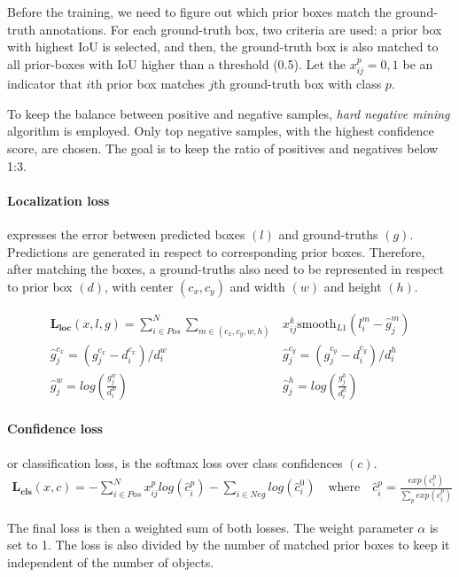 Before the training, we need to figure out which prior boxes match the ground-truth annotations. For each ground-truth box, two criteria are used: a prior box with highest IoU is selected, and then, the ground-truth box is also matched to all prior-boxes with IoU higher than a threshold (0.5). Let the $x_{ij}^p = {0,1}$ be an indicator that $i$th prior box matches $j$th ground-truth box with class $p$.

To keep the balance between positive and negative samples, \textit{hard negative mining} algorithm is employed. Only top negative samples, with the highest confidence score, are chosen. The goal is to keep the ratio of positives and negatives below 1:3.

\paragraph{Localization loss} expresses the error between predicted boxes $(l)$ and ground-truths $(g)$. Predictions are generated in respect to corresponding prior boxes. Therefore, after matching the boxes, a ground-truths also need to be represented in respect to prior box $(d)$, with center $(c_x,c_y)$ and width $(w)$ and height $(h)$.

\begin{align*}
\mathbf{L_{\text{loc}}}(x,l,g) = \sum_{i\in Pos}^N \sum_{m\in(c_x, c_y, w, h)} &x_{ij}^k\text{smooth}_{L1}(l_i^m-\hat{g}_j^m) \\
\hat{g}_j^{c_x} = (g_j^{c_x} - d_i^{c_x}) / d_i^{w} \qquad& \hat{g}_j^{c_y} = (g_j^{c_y} - d_i^{c_y}) / d_i^{h} \\
\hat{g}_j^{w} = log(\frac{g_j^{w}}{d_i^w}) \qquad& \hat{g}_j^{h} = log(\frac{g_j^{h}}{d_i^h})
\end{align*}

\paragraph{Confidence loss} or classification loss, is the softmax loss over class confidences $(c)$.
\begin{align*}
\mathbf{L_{\text{cls}}}(x,c) = -\sum_{i\in Pos}^N x_{ij}^p log(\hat{c}_i^p) - \sum_{i \in Neg} log(\hat{c}_i^0) \quad\text{where} \quad\hat{c}_i^p = \frac{exp(c_i^p)}{\sum_p exp(c_i^p)}
\end{align*}

\noindent The final loss is then a weighted sum of both losses. The weight parameter $\alpha$ is set to 1. The loss is also divided by the number of matched prior boxes to keep it independent of the number of objects.

